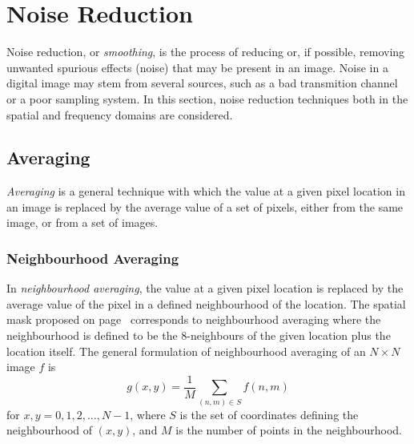 
\section{Noise Reduction}
\label{image:noise}

Noise reduction, or {\em smoothing\/}, is the process of reducing or,
if possible, removing unwanted spurious effects (noise) that may be
present in an image.  Noise in a digital image may stem from several
sources, such as a bad transmition channel or a poor sampling system.
In this section, noise reduction techniques both in the spatial and
frequency domains are considered.

\subsection{Averaging}
\label{image:noise:averaging}

{\em Averaging\/} is a general technique with which the value at a
given pixel location in an image is replaced by the average value of a
set of pixels, either from the same image, or from a set of images.

\subsubsection{Neighbourhood Averaging}

In {\em neighbourhood averaging\/}, the value at a given pixel
location is replaced by the average value of the pixel in a defined
neighbourhood of the location.  The spatial mask proposed on
page~\pageref{pg:image:spatial:mask} corresponds to neighbourhood
averaging where the neighbourhood is defined to be the 8-neighbours of
the given location plus the location itself.  The general formulation
of neighbourhood averaging of an $N\times N$ image $f$ is
\begin{equation}
\label{eq:averaging:neighbourhood}
  g(x,y)=\frac{1}{M}\sum_{(n,m)\in S}f(n,m)
\end{equation}
for $x,y=0,1,2,\ldots,N-1$, where $S$ is the set of coordinates
defining the neighbourhood of $(x,y)$, and $M$ is the number of points
in the neighbourhood.

